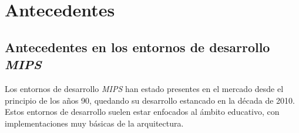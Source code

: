 \chapter{Antecedentes}\label{ch:antecedentes}


\section{Antecedentes en los entornos de desarrollo \textit{MIPS}}
\label{sec:antecedentes-en-los-entornos-de-desarrollo-mips}

Los entornos de desarrollo \textit{MIPS} han estado presentes en
el mercado desde el principio de los años 90, quedando su desarrollo
estancado en la década de 2010.
Estos entornos de desarrollo suelen estar enfocados al ámbito
educativo, con implementaciones muy básicas de la arquitectura.

